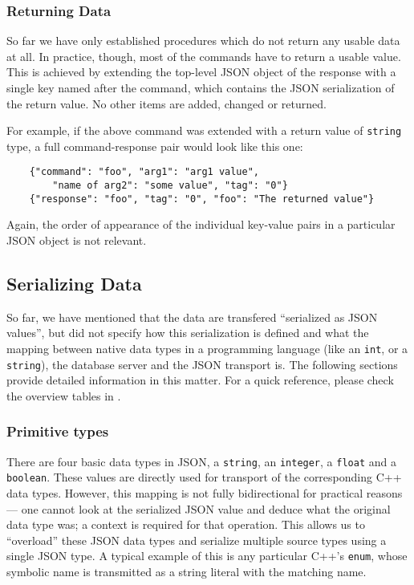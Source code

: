 \documentclass[deska]{subfiles}
\begin{document}
\subsubsection{Returning Data}

So far we have only established procedures which do not return any usable data at all.  In practice, though, most of the
commands have to return a usable value.  This is achieved by extending the top-level JSON object of the response with a
single key named after the command, which contains the JSON serialization of the return value.  No other items are
added, changed or returned.

For example, if the above command was extended with a return value of {\tt string} type, a full command-response pair
would look like this one:

\begin{verbatim}
    {"command": "foo", "arg1": "arg1 value",
        "name of arg2": "some value", "tag": "0"}
    {"response": "foo", "tag": "0", "foo": "The returned value"}
\end{verbatim}

Again, the order of appearance of the individual key-value pairs in a particular JSON object is not relevant.

\subsection{Serializing Data}

So far, we have mentioned that the data are transfered ``serialized as JSON values'', but did not specify how this
serialization is defined and what the mapping between native data types in a programming language (like an {\tt int}, or
a {\tt string}), the database server and the JSON transport is.  The following sections provide detailed information in
this matter.  For a quick reference, please check the overview tables in .

\subsubsection{Primitive types}

There are four basic data types in JSON, a {\tt string}, an {\tt integer}, a {\tt float} and a {\tt boolean}.  These
values are directly used for transport of the corresponding C++ data types.  However, this mapping is not fully
bidirectional for practical reasons --- one cannot look at the serialized JSON value and deduce what the original data
type was; a context is required for that operation.  This allows us to ``overload'' these JSON data types and serialize
multiple source types using a single JSON type.  A typical example of this is any particular C++'s {\tt enum}, whose
symbolic name is transmitted as a string literal with the matching name.
\end{document}
